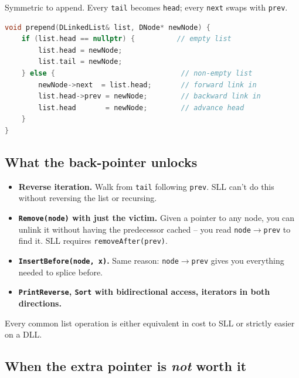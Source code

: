 \documentclass[11pt]{article}
\begin{document}
Symmetric to append. Every \texttt{tail} becomes \texttt{head};
every \texttt{next} swaps with \texttt{prev}.

\begin{examplebox}
\begin{lstlisting}[basicstyle=\ttfamily\small,frame=single,language=C++]
void prepend(DLinkedList& list, DNode* newNode) {
    if (list.head == nullptr) {          // empty list
        list.head = newNode;
        list.tail = newNode;
    } else {                              // non-empty list
        newNode->next  = list.head;       // forward link in
        list.head->prev = newNode;        // backward link in
        list.head       = newNode;        // advance head
    }
}
\end{lstlisting}
\end{examplebox}

\subsection{What the back-pointer unlocks}

\begin{ideabox}
\begin{itemize}[leftmargin=*]
  \item \textbf{Reverse iteration.} Walk from \texttt{tail}
        following \texttt{prev}. SLL can't do this without
        reversing the list or recursing.
  \item \textbf{\texttt{Remove(node)} with just the victim.} Given a
        pointer to any node, you can unlink it without having the
        predecessor cached -- you read \texttt{node$\to$prev} to
        find it. SLL requires \texttt{removeAfter(prev)}.
  \item \textbf{\texttt{InsertBefore(node, x)}.} Same reason:
        \texttt{node$\to$prev} gives you everything needed to
        splice before.
  \item \textbf{\texttt{PrintReverse}, \texttt{Sort} with
        bidirectional access, iterators in both directions.}
\end{itemize}
Every common list operation is either equivalent in cost to SLL or
strictly easier on a DLL.
\end{ideabox}

\subsection{When the extra pointer is \emph{not} worth it}
\end{document}
